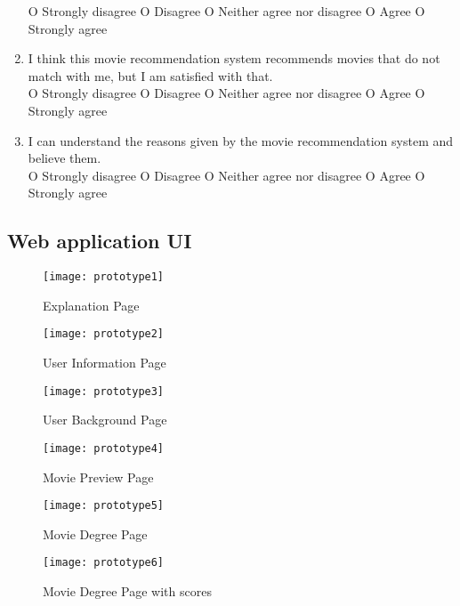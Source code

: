 \begin{enumerate}
O Strongly disagree O Disagree O Neither agree nor disagree O Agree O Strongly agree

\item I think this movie recommendation system recommends movies that do not match with me, but I am satisfied with that.\\

O Strongly disagree O Disagree O Neither agree nor disagree O Agree O Strongly agree

\item I can understand the reasons given by the movie recommendation system and believe them.\\

O Strongly disagree O Disagree O Neither agree nor disagree O Agree O Strongly agree

\end{enumerate}

\subsection{Web application UI}

\begin{figure}[h]
\caption{Explanation Page}
\label{figure:8-1}
\centering
\texttt{[image: prototype1]}
\end{figure}

\begin{figure}[h]
\caption{User Information Page}
\label{figure:8-2}
\centering
\texttt{[image: prototype2]}
\end{figure}

\begin{figure}[h]
\caption{User Background Page}
\label{figure:8-3}
\centering
\texttt{[image: prototype3]}
\end{figure}

\begin{figure}[h]
\caption{Movie Preview Page}
\label{figure:8-4}
\centering
\texttt{[image: prototype4]}
\end{figure}

\begin{figure}[h]
\caption{Movie Degree Page}
\label{figure:8-5}
\centering
\texttt{[image: prototype5]}
\end{figure}

\begin{figure}[h]
\caption{Movie Degree Page with scores}
\label{figure:8-6}
\centering
\texttt{[image: prototype6]}
\end{figure}

